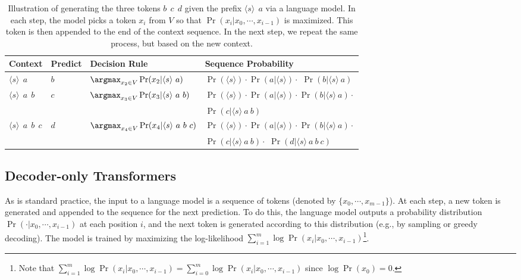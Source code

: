\begin{table}[t]
\centering
\begingroup
\renewcommand{\arraystretch}{1.2}
\begin{tabular}{l | l | l | l}
Context & Predict & Decision Rule & Sequence Probability \\ \hline
$\langle s \rangle\ \ a$ & $b$ & $\argmax_{x_2 \in V} \Pr(x_{2}|\langle s \rangle\ a)$ & $\Pr(\langle s \rangle) \cdot \Pr(a|\langle s \rangle) \cdot $ \colorbox{gray!30}{$\Pr(b|\langle s \rangle\ a)$} \\ \hline
$\langle s \rangle\ \ a\ \ b$ & $c$ & $\argmax_{x_3 \in V} \Pr(x_{3}|\langle s \rangle\ a\ b)$ & $\Pr(\langle s \rangle) \cdot \Pr(a|\langle s \rangle) \cdot \Pr(b|\langle s \rangle\ a) \cdot$ \\
& & & \colorbox{gray!30}{$\Pr(c|\langle s \rangle\ a\ b)$} \\ \hline
$\langle s \rangle\ \ a\ \ b\ \ c$ & $d$ & $\argmax_{x_4 \in V} \Pr(x_{4}|\langle s \rangle\ a\ b\ c)$ & $\Pr(\langle s \rangle) \cdot \Pr(a|\langle s \rangle) \cdot \Pr(b|\langle s \rangle\ a) \cdot$ \\
& & & $\Pr(c|\langle s \rangle\ a\ b) \cdot $ \colorbox{gray!30}{$\Pr(d|\langle s \rangle\ a\ b\ c)$} \\
\end{tabular}
\endgroup
\caption{Illustration of generating the three tokens $b\ \ c\ \ d$ given the prefix $\langle s \rangle\ \ a$ via a language model. In each step, the model picks a token $x_i$ from $V$ so that $\Pr(x_{i}|x_0,\cdots,x_{i-1})$ is maximized. This token is then appended to the end of the context sequence. In the next step, we repeat the same process, but based on the new context.}
\label{tab:lm-generation-abcd}
\end{table}

\subsection{Decoder-only Transformers}
\label{sec:decoder-only-transformers}

\noindent As is standard practice, the input to a language model is a sequence of tokens (denoted by $\{x_0,\cdots,x_{m-1}\}$). At each step, a new token is generated and appended to the sequence for the next prediction. To do this, the language model outputs a probability distribution $\Pr(\cdot|x_0,\cdots,x_{i-1})$ at each position $i$, and the next token is generated according to this distribution (e.g., by sampling or greedy decoding). The model is trained by maximizing the log-likelihood $\sum_{i=1}^{m} \log \Pr(x_i|x_0,\allowbreak \cdots,x_{i-1})$\footnote{Note that $\sum_{i=1}^{m} \log \Pr(x_i|x_0,\cdots,x_{i-1}) = \sum_{i=0}^{m} \log \Pr(x_i | x_0,\cdots,x_{i-1})$ since $\log \Pr(x_0) = 0$.}.

